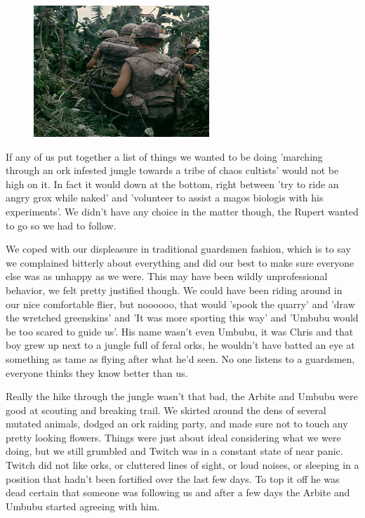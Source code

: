 \begin{figure}
	\begin{center}
		\includegraphics[width=\figwidth]{pics/6/30.png}
	\end{center}
\end{figure}
If any of us put together a list of things we wanted to be doing 'marching through an ork infested jungle towards a tribe of chaos cultists' would not be high on it. 
In fact it would down at the bottom, right between 'try to ride an angry grox while naked' and 'volunteer to assist a magos biologis with his experiments'. 
We didn't have any choice in the matter though, the Rupert wanted to go so we had to follow. 

We coped with our displeasure in traditional guardsmen fashion, which is to say we complained bitterly about everything and did our best to make sure everyone else was as unhappy as we were. 
This may have been wildly unprofessional behavior, we felt pretty justified though. 
We could have been riding around in our nice comfortable flier, but noooooo, that would 'spook the quarry' and 'draw the wretched greenskins' and 'It was more sporting this way' and 'Umbubu would be too scared to guide us'. 
His name wasn't even Umbubu, it was Chris and that boy grew up next to a jungle full of feral orks, he wouldn't have batted an eye at something as tame as flying after what he'd seen. 
No one listens to a guardsmen, everyone thinks they know better than us.

Really the hike through the jungle wasn't that bad, the Arbite and Umbubu were good at scouting and breaking trail. 
We skirted around the dens of several mutated animals, dodged an ork raiding party, and made sure not to touch any pretty looking flowers. 
Things were just about ideal considering what we were doing, but we still grumbled and Twitch was in a constant state of near panic. 
Twitch did not like orks, or cluttered lines of sight, or loud noises, or sleeping in a position that hadn't been fortified over the last few days. 
To top it off he was dead certain that someone was following us and after a few days the Arbite and Umbubu started agreeing with him.

